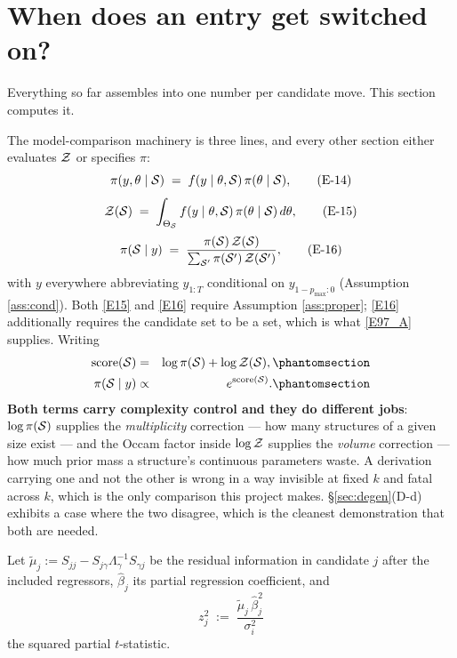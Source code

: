 \section{When does an entry get switched on?}\label{sec:inclusion}

Everything so far assembles into one number per candidate move. This section
computes it.

The model-comparison machinery is three lines, and every other section either
evaluates $\mathcal{Z}$ or specifies $\pi$:
\begin{equation}
\pi(y,\theta\mid\mathcal{S}) \;=\; f(y\mid\theta,\mathcal{S})\,\pi(\theta\mid\mathcal{S}),
\tag{E-14}\label{E14}
\end{equation}
\begin{equation}
\mathcal{Z}(\mathcal{S}) \;=\; \int_{\Theta_{\mathcal{S}}} f(y\mid\theta,\mathcal{S})\,\pi(\theta\mid\mathcal{S})\,d\theta,
\tag{E-15}\label{E15}
\end{equation}
\begin{equation}
\pi(\mathcal{S}\mid y) \;=\; \frac{\pi(\mathcal{S})\,\mathcal{Z}(\mathcal{S})}{\sum_{\mathcal{S}'}\pi(\mathcal{S}')\,\mathcal{Z}(\mathcal{S}')},
\tag{E-16}\label{E16}
\end{equation}
with $y$ everywhere abbreviating $y_{1:T}$ conditional on $y_{1-p_{\max}:0}$
(Assumption \ref{ass:cond}). Both \eqref{E15} and \eqref{E16} require Assumption
\ref{ass:proper}; \eqref{E16} additionally requires the candidate set to be a set,
which is what \eqref{E97_A} supplies. Writing
\begin{eqnarray}
\operatorname{score}(\Sc) &=& \log\pi(\Sc)+\log\Zc(\Sc),
  \Elabel{E-24A}{E24_A} \\
\pi(\Sc\mid y) &\propto& e^{\operatorname{score}(\Sc)}.
  \Elabel{E-24B}{E24_B}
\end{eqnarray}
\textbf{Both terms carry complexity control and they do different jobs}:
$\log\pi(\mathcal{S})$ supplies the \emph{multiplicity} correction --- how many structures of
a given size exist --- and the Occam factor inside $\log\mathcal{Z}$ supplies the
\emph{volume} correction --- how much prior mass a structure's continuous parameters
waste. A derivation carrying one and not the other is wrong in a way invisible at
fixed $k$ and fatal across $k$, which is the only comparison this project makes.
\S\ref{sec:degen}(D-d) exhibits a case where the two disagree, which is the cleanest
demonstration that both are needed.

Let $\tilde\mu_j:=S_{jj}-S_{j\gamma}\Lambda_\gamma^{-1}S_{\gamma j}$ be the residual
information in candidate $j$ after the included regressors, $\hat\beta_j$ its partial
regression coefficient, and
\begin{equation}
z_j^2 \;:=\; \frac{\tilde\mu_j\,\hat\beta_j^2}{\sigma_i^2}
\tag{E-118}\label{E118}
\end{equation}
the squared partial $t$-statistic.

